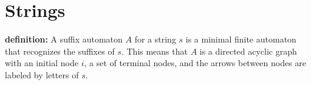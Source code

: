 \section{Strings}



\textbf{definition:} A suffix automaton $A$ for a string $s$ is a minimal finite automaton that recognizes the suffixes of $s$. This means that $A$ is a directed acyclic graph with an initial node $i$, a set of terminal nodes, and the arrows between nodes are labeled by letters of $s$.
